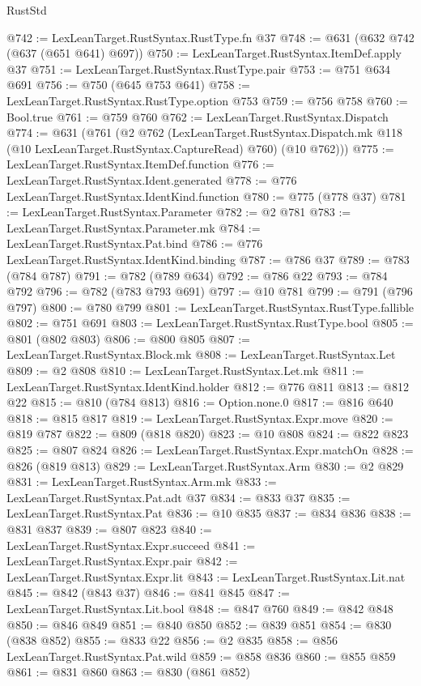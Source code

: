 \begin{lexlean}{RustStd}
\begin{coremodule}
@742 := LexLeanTarget.RustSyntax.RustType.fn @37
@748 := @631 (@632 @742 (@637 (@651 @641) @697))
@750 := LexLeanTarget.RustSyntax.ItemDef.apply @37
@751 := LexLeanTarget.RustSyntax.RustType.pair
@753 := @751 @634 @691
@756 := @750 (@645 @753 @641)
@758 := LexLeanTarget.RustSyntax.RustType.option @753
@759 := @756 @758
@760 := Bool.true
@761 := @759 @760
@762 := LexLeanTarget.RustSyntax.Dispatch
@774 := @631
    (@761
      (@2
        @762
        (LexLeanTarget.RustSyntax.Dispatch.mk @118 (@10 LexLeanTarget.RustSyntax.CaptureRead) @760)
        (@10 @762)))
@775 := LexLeanTarget.RustSyntax.ItemDef.function
@776 := LexLeanTarget.RustSyntax.Ident.generated
@778 := @776 LexLeanTarget.RustSyntax.IdentKind.function
@780 := @775 (@778 @37)
@781 := LexLeanTarget.RustSyntax.Parameter
@782 := @2 @781
@783 := LexLeanTarget.RustSyntax.Parameter.mk
@784 := LexLeanTarget.RustSyntax.Pat.bind
@786 := @776 LexLeanTarget.RustSyntax.IdentKind.binding
@787 := @786 @37
@789 := @783 (@784 @787)
@791 := @782 (@789 @634)
@792 := @786 @22
@793 := @784 @792
@796 := @782 (@783 @793 @691)
@797 := @10 @781
@799 := @791 (@796 @797)
@800 := @780 @799
@801 := LexLeanTarget.RustSyntax.RustType.fallible
@802 := @751 @691
@803 := LexLeanTarget.RustSyntax.RustType.bool
@805 := @801 (@802 @803)
@806 := @800 @805
@807 := LexLeanTarget.RustSyntax.Block.mk
@808 := LexLeanTarget.RustSyntax.Let
@809 := @2 @808
@810 := LexLeanTarget.RustSyntax.Let.mk
@811 := LexLeanTarget.RustSyntax.IdentKind.holder
@812 := @776 @811
@813 := @812 @22
@815 := @810 (@784 @813)
@816 := Option.none.{0}
@817 := @816 @640
@818 := @815 @817
@819 := LexLeanTarget.RustSyntax.Expr.move
@820 := @819 @787
@822 := @809 (@818 @820)
@823 := @10 @808
@824 := @822 @823
@825 := @807 @824
@826 := LexLeanTarget.RustSyntax.Expr.matchOn
@828 := @826 (@819 @813)
@829 := LexLeanTarget.RustSyntax.Arm
@830 := @2 @829
@831 := LexLeanTarget.RustSyntax.Arm.mk
@833 := LexLeanTarget.RustSyntax.Pat.adt @37
@834 := @833 @37
@835 := LexLeanTarget.RustSyntax.Pat
@836 := @10 @835
@837 := @834 @836
@838 := @831 @837
@839 := @807 @823
@840 := LexLeanTarget.RustSyntax.Expr.succeed
@841 := LexLeanTarget.RustSyntax.Expr.pair
@842 := LexLeanTarget.RustSyntax.Expr.lit
@843 := LexLeanTarget.RustSyntax.Lit.nat
@845 := @842 (@843 @37)
@846 := @841 @845
@847 := LexLeanTarget.RustSyntax.Lit.bool
@848 := @847 @760
@849 := @842 @848
@850 := @846 @849
@851 := @840 @850
@852 := @839 @851
@854 := @830 (@838 @852)
@855 := @833 @22
@856 := @2 @835
@858 := @856 LexLeanTarget.RustSyntax.Pat.wild
@859 := @858 @836
@860 := @855 @859
@861 := @831 @860
@863 := @830 (@861 @852)

\end{coremodule}
\end{lexlean}
